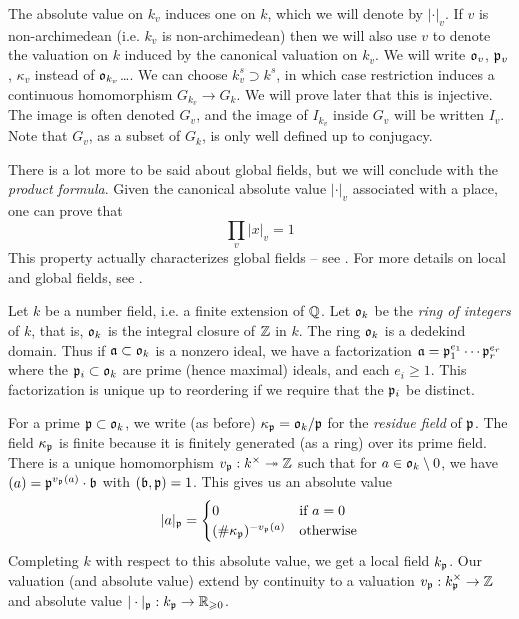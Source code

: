 \documentclass{article}
\begin{document}
The absolute value on $k_v$ induces one on $k$, which we will denote by 
$|\cdot|_v$. If $v$ is non-archimedean (i.e. $k_v$ is non-archimedean) then we 
will also use $v$ to denote the valuation on $k$ induced by the canonical 
valuation on $k_v$. We will write $\mathfrak{o}_v$, $\mathfrak{p}_v$, $\kappa_v$ instead of 
$\mathfrak{o}_{k_v}$\ldots. We can choose $k_v^s\supset k^s$, in which case restriction 
induces a continuous homomorphism $G_{k_v} \to G_k$. We will prove later that 
this is injective. The image is often denoted $G_v$, and the image of 
$I_{k_v}$ inside $G_v$ will be written $I_v$. Note that $G_v$, as a subset of 
$G_k$, is only well defined up to conjugacy. 

There is a lot more to be said about global fields, but we will conclude with 
the \emph{product formula}. Given the canonical absolute value $|\cdot|_v$ 
associated with a place, one can prove that 
\[
  \prod_v |x|_v = 1
\]
This property actually characterizes global fields -- see \cite{ar45}. For 
more details on local and global fields, see \cite{we95}. 











Let $k$ be a number field, i.e. a finite extension of $\mathbb{Q}$. Let $\mathfrak{o}_k$ be the 
\emph{ring of integers} of $k$, that is, $\mathfrak{o}_k$ is the integral closure of 
$\mathbb{Z}$ in $k$. The ring $\mathfrak{o}_k$ is a dedekind domain. Thus if $\mathfrak{a}\subset \mathfrak{o}_k$ 
is a nonzero ideal, we have a factorization $\mathfrak{a}=\mathfrak{p}_1^{e_1}\dotsm \mathfrak{p}_r^{e_r}$ 
where the $\mathfrak{p}_i\subset\mathfrak{o}_k$ are prime (hence maximal) ideals, and each 
$e_i\geqslant 1$. This factorization is unique up to reordering if we require 
that the $\mathfrak{p}_i$ be distinct. 

For a prime $\mathfrak{p}\subset \mathfrak{o}_k$, we write (as before) $\kappa_{\mathfrak{p}} = \mathfrak{o}_k/\mathfrak{p}$ 
for the \emph{residue field} of $\mathfrak{p}$. The field $\kappa_{\mathfrak{p}}$ is finite because 
it is finitely generated (as a ring) over its prime field. There is a unique 
homomorphism $v_{\mathfrak{p}}:k^\times \twoheadrightarrow \mathbb{Z}$ such that for 
$a\in \mathfrak{o}_k\setminus 0$, we have $(a)=\mathfrak{p}^{v_{\mathfrak{p}}(a)}\cdot \mathfrak{b}$ with 
$(\mathfrak{b},\mathfrak{p})=1$. This gives us an absolute value 
\[
  |a|_{\mathfrak{p}} = \begin{cases}
              0 & \text{if $a=0$} \\
              (\# \kappa_{\mathfrak{p}})^{-v_{\mathfrak{p}}(a)} & \text{otherwise}
            \end{cases}
\]
Completing $k$ with respect to this absolute value, we get a local field 
$k_{\mathfrak{p}}$. Our valuation (and absolute value) extend by continuity to a 
valuation $v_{\mathfrak{p}}:k_{\mathfrak{p}}^\times\to\mathbb{Z}$ and absolute value 
$|\cdot|_{\mathfrak{p}}:k_{\mathfrak{p}}\to\mathbb{R}_{\geqslant 0}$. 
\end{document}
